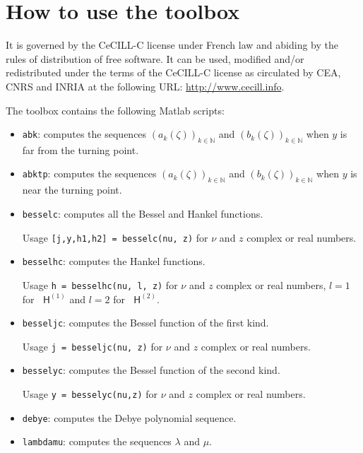 \documentclass[12pt,a4paper]{article}
\numberwithin{equation}{section}
\newcommand{\bbN}{\mathbb{N}}
\newcommand{\hO}{\mathop{}\!\mathsf{H}^{(1)}}
\newcommand{\hT}{\mathop{}\!\mathsf{H}^{(2)}}
\newcommand{\plr}[1]{\left(#1\right)}
\theoremstyle{definition}
\theoremstyle{plain}
\theoremstyle{remark}
\begin{document}
\section{How to use the toolbox}

It is governed by the CeCILL-C license under French law and abiding by the rules of distribution of free software.
It can be used, modified and/or redistributed under the terms of the CeCILL-C license as circulated by CEA, CNRS and INRIA at the following URL: \url{http://www.cecill.info}.

The toolbox contains the following Matlab scripts:
\begin{itemize}
    \item \verb|abk|: computes the sequences \( \plr{a_k(\zeta)}_{k \in \bbN} \) and \( \plr{b_k(\zeta)}_{k \in \bbN} \) when \( y \) is far from the turning point.

    \item \verb|abktp|: computes the sequences \( (a_k(\zeta))_{k \in \bbN} \) and \( (b_k(\zeta))_{k \in \bbN} \) when \( y \) is near the turning point.

    \item \verb|besselc|: computes all the Bessel and Hankel functions.

          Usage \verb|[j,y,h1,h2] = besselc(nu, z)| for \( \nu \) and \( z \) complex or real numbers.

    \item \verb|besselhc|: computes the Hankel functions.

          Usage \verb|h = besselhc(nu, l, z)| for \( \nu \) and \( z \) complex or real numbers, \( l=1 \) for \( \hO \) and \( l=2 \) for \( \hT \).

    \item \verb|besseljc|: computes the Bessel function of the first kind.

          Usage \verb|j = besseljc(nu, z)| for \( \nu \) and \( z \) complex or real numbers.

    \item \verb|besselyc|: computes the Bessel function of the second kind.

          Usage \verb|y = besselyc(nu,z)| for \( \nu \) and \( z \) complex or real numbers.

    \item \verb|debye|: computes the Debye polynomial sequence.

    \item \verb|lambdamu|: computes the sequences \( \lambda \) and \( \mu \).
\end{itemize}
\end{document}
